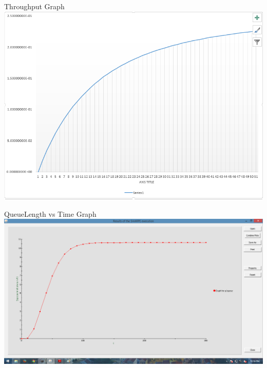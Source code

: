 \documentclass[a4paper,12pt]{report}
\begin{document}
\begin{center}
Throughput Graph
 \includegraphics[width=15 cm,height=13 cm]{./throughput.PNG}
\end{center}
\begin{center}
QueueLength vs Time Graph
 \includegraphics[width=15 cm,height=13 cm]{./queue1.png}
\end{center}
\end{document}
